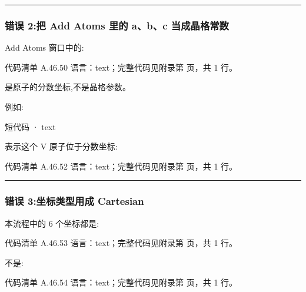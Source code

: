 \documentclass[lang=cn,scheme=chinese,color=blue,device=normal,toc=onecol,math=cm]{elegantbook}
\begin{document}
\medskip\hrule\medskip


\subsubsection{错误 2:把 Add Atoms 里的 a、b、c 当成晶格常数}


Add Atoms 窗口中的:\par


\begin{codeindexbox}{代码清单 A.46.50}
语言：text；完整代码见附录第 \pageref{code:46:50} 页，共 1 行。
\end{codeindexbox}


是原子的分数坐标,不是晶格参数。\par


例如:\par


\begin{inlinecodebox}{短代码 · text}
\end{inlinecodebox}


表示这个 V 原子位于分数坐标:\par


\begin{codeindexbox}{代码清单 A.46.52}
语言：text；完整代码见附录第 \pageref{code:46:52} 页，共 1 行。
\end{codeindexbox}


\medskip\hrule\medskip


\subsubsection{错误 3:坐标类型用成 Cartesian}


本流程中的 6 个坐标都是:\par


\begin{codeindexbox}{代码清单 A.46.53}
语言：text；完整代码见附录第 \pageref{code:46:53} 页，共 1 行。
\end{codeindexbox}


不是:\par


\begin{codeindexbox}{代码清单 A.46.54}
语言：text；完整代码见附录第 \pageref{code:46:54} 页，共 1 行。
\end{codeindexbox}
\end{document}
